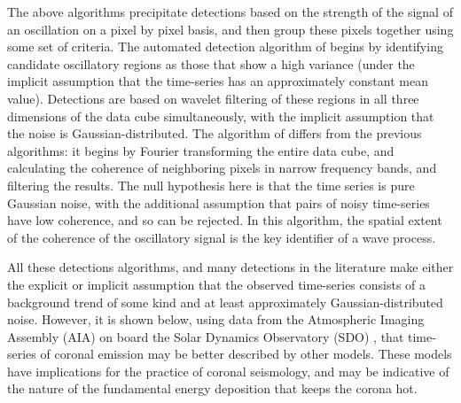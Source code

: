 \documentclass{aastex}
\begin{document}
The above algorithms precipitate detections based on the strength of
the signal of an oscillation on a pixel by pixel basis, and then group
these pixels together using some set of criteria.  The automated
detection algorithm of \cite{2008SoPh..248..395S} begins by
identifying candidate oscillatory regions as those that show a high
variance \citep{2003SoPh..213..103G} (under the implicit assumption
that the time-series has an approximately constant mean value).
Detections are based on wavelet filtering of these regions in all
three dimensions of the data cube simultaneously, with the implicit
assumption that the noise is Gaussian-distributed.  The algorithm of
\cite{2008SoPh..252..321M} differs from the previous algorithms: it
begins by Fourier transforming the entire data cube, and calculating
the coherence of neighboring pixels in narrow frequency bands, and
filtering the results. The null hypothesis here is that the time
series is pure Gaussian noise, with the additional assumption that
pairs of noisy time-series have low coherence, and so can be rejected.
In this algorithm, the spatial extent of the coherence of the
oscillatory signal is the key identifier of a wave process.

All these detections algorithms, and many detections in the literature
make either the explicit or implicit assumption that the observed
time-series consists of a background trend of some kind and at least
approximately Gaussian-distributed noise.  However, it is shown below,
using data from the Atmospheric Imaging Assembly (AIA)
\cite{2012SoPh..275...17L} on board the Solar Dynamics Observatory
(SDO) \cite{2012SoPh..275....3P}, that time-series of coronal emission
may be better described by other models.  These models have
implications for the practice of coronal seismology, and may be
indicative of the nature of the fundamental energy deposition that
keeps the corona hot.
\end{document}
